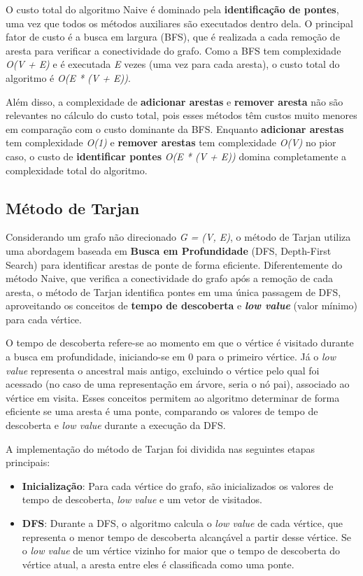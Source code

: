 \documentclass{sbc2023}%
\begin{document}
O custo total do algoritmo Naive é dominado pela \textbf{identificação de pontes}, uma vez que todos os métodos auxiliares são executados dentro dela. O principal fator de custo é a busca em largura (BFS), que é realizada a cada remoção de aresta para verificar a conectividade do grafo. Como a BFS tem complexidade \textit{O(V + E)} e é executada \textit{E} vezes (uma vez para cada aresta), o custo total do algoritmo é \textit{O(E * (V + E))}.

Além disso, a complexidade de \textbf{adicionar arestas} e \textbf{remover aresta} não são relevantes no cálculo do custo total, pois esses métodos têm custos muito menores em comparação com o custo dominante da BFS. Enquanto \textbf{adicionar arestas} tem complexidade\textit{ O(1)} e \textbf{remover arestas} tem complexidade \textit{O(V)} no pior caso, o custo de \textbf{identificar pontes} \textit{O(E * (V + E))} domina completamente a complexidade total do algoritmo.

\subsection{Método de Tarjan}
Considerando um grafo não direcionado \textit{G = (V, E)}, o método de Tarjan utiliza uma abordagem baseada em \textbf{Busca em Profundidade} (DFS, Depth-First Search) para identificar arestas de ponte de forma eficiente. Diferentemente do método Naive, que verifica a conectividade do grafo após a remoção de cada aresta, o método de Tarjan identifica pontes em uma única passagem de DFS, aproveitando os conceitos de \textbf{tempo de descoberta} e \textbf{\textit{low value}} (valor mínimo) para cada vértice.

O tempo de descoberta refere-se ao momento em que o vértice é visitado durante a busca em profundidade, iniciando-se em 0 para o primeiro vértice. Já o \textit{low value} representa o ancestral mais antigo, excluindo o vértice pelo qual foi acessado (no caso de uma representação em árvore, seria o nó pai), associado ao vértice em visita. Esses conceitos permitem ao algoritmo determinar de forma eficiente se uma aresta é uma ponte, comparando os valores de tempo de descoberta e \textit{low value} durante a execução da DFS.

A implementação do método de Tarjan foi dividida nas seguintes etapas principais:
\begin{itemize}
\item \textbf{Inicialização}: Para cada vértice do grafo, são inicializados os valores de tempo de descoberta, \textit{low value} e um vetor de visitados.
\item \textbf{DFS}: Durante a DFS, o algoritmo calcula o \textit{low value} de cada vértice, que representa o menor tempo de descoberta alcançável a partir desse vértice. Se o \textit{low value} de um vértice vizinho for maior que o tempo de descoberta do vértice atual, a aresta entre eles é classificada como uma ponte.
\end{itemize}
\end{document}
